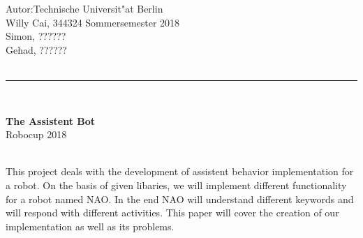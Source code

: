 \documentclass[11pt, a4paper]{article}
\begin{document}

\renewcommand{\footrulewidth}{0,2pt}


\pagestyle{fancy}
\fancyhead[L]{}
\fancyhead[C]{}
\fancyhead[R]{}
\fancyfoot[L]{}
\fancyfoot[R]{}
\fancyfoot[C]{~\\ \thepage}




{\normalsize
\noindent  Autor:\hfill Technische Universit"at Berlin\\
Willy Cai, 344324 \hfill Sommersemester 2018\\
Simon, ?????? \\
Gehad, ?????? \\\\
\hrule
\ \\[6cm]

}

\begin{center}
  \textbf{\LARGE The Assistent Bot} \\[0.4cm] { \Large Robocup 2018}\\[3cm] \

  \begin{minipage}{0.9\textwidth}
  This project deals with the development of assistent behavior implementation for a robot. On the basis of given libaries, we will implement different functionality for a robot named NAO. In the end NAO will understand different keywords and will respond with different activities. This paper will cover the creation of our implementation as well as its problems.
  \end{minipage}
\end{center}
\end{document}
